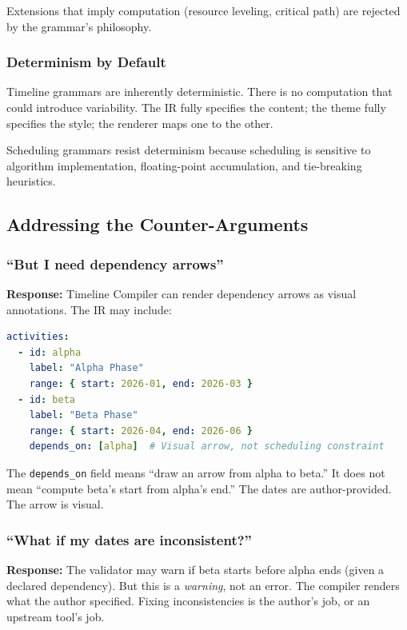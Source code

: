 Extensions that imply computation (resource leveling, critical path) are rejected by the grammar's philosophy.

\subsubsection{Determinism by Default}

Timeline grammars are inherently deterministic. There is no computation that could introduce variability. The IR fully specifies the content; the theme fully specifies the style; the renderer maps one to the other.

Scheduling grammars resist determinism because scheduling is sensitive to algorithm implementation, floating-point accumulation, and tie-breaking heuristics.

\subsection{Addressing the Counter-Arguments}

\subsubsection{``But I need dependency arrows''}

\textbf{Response:} Timeline Compiler can render dependency arrows as visual annotations. The IR may include:
\begin{lstlisting}[language=yaml]
activities:
  - id: alpha
    label: "Alpha Phase"
    range: { start: 2026-01, end: 2026-03 }
  - id: beta
    label: "Beta Phase"
    range: { start: 2026-04, end: 2026-06 }
    depends_on: [alpha]  # Visual arrow, not scheduling constraint
\end{lstlisting}

The \texttt{depends\_on} field means ``draw an arrow from alpha to beta.'' It does not mean ``compute beta's start from alpha's end.'' The dates are author-provided. The arrow is visual.

\subsubsection{``What if my dates are inconsistent?''}

\textbf{Response:} The validator may warn if beta starts before alpha ends (given a declared dependency). But this is a \emph{warning}, not an error. The compiler renders what the author specified. Fixing inconsistencies is the author's job, or an upstream tool's job.

